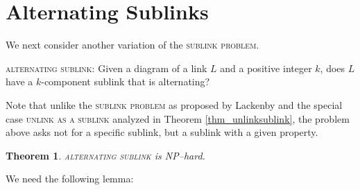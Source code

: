 \documentclass[12pt]{amsart}
\newtheorem{thm}{Theorem}
\theoremstyle{definition}
\theoremstyle{remark}
\begin{document}
\section{Alternating Sublinks}
\label{sec_alternatingsublink}

We next consider another variation of the \textsc{sublink problem}.


\vspace{0.14in}

\textsc{alternating sublink}: Given a diagram of a link $L$ and a positive integer $k$, does $L$ have a $k$-component sublink that is alternating?

\vspace{0.14in}

Note that unlike the \textsc{sublink problem} as proposed by Lackenby and the special case \textsc{unlink as a sublink} analyzed in Theorem \ref{thm_unlinksublink}, the problem above asks not for a specific sublink, but a sublink with a given property.

\begin{thm}
\textsc{alternating sublink} is NP--hard.
\label{thm_altsub}
\end{thm}


We need the following lemma:
\end{document}
